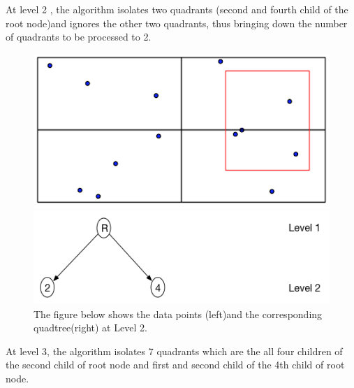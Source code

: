 \documentclass{article}
\begin{document}
At level 2 , the algorithm isolates  two quadrants (second and fourth child of the root node)and ignores the other two quadrants, thus bringing down the number of quadrants to be processed to 2.
\begin{figure}[H]
  \centering
  \begin{minipage}[b]{0.35\textwidth}
    \includegraphics[width=\textwidth]{2Quad_2}  
  \end{minipage}
  \hfill
  \begin{minipage}[b]{0.6\textwidth}
    \includegraphics[width=\textwidth]{2Quad_2_tree}
  \end{minipage}
  \caption{The figure below shows the data points (left)and the corresponding quadtree(right) at Level 2.}
\end{figure}

\vspace{2cm}

At level 3, the algorithm  isolates 7 quadrants which are the all four children of the second child of root node and first and second child of the 4th child of root node.
\end{document}
